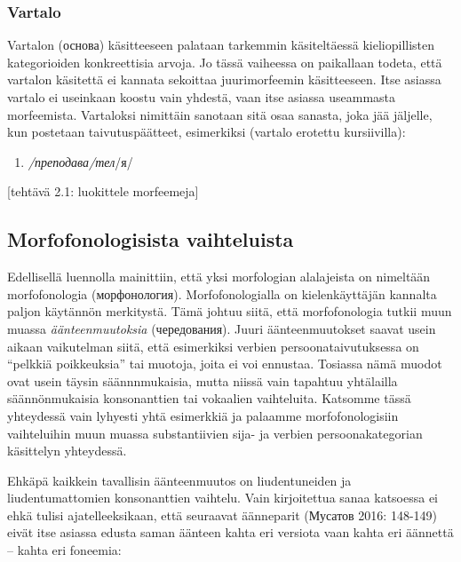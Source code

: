 \documentclass[]{scrartcl}
\begin{document}
\subsubsection{Vartalo}\label{vartalo}

Vartalon (основа) käsitteeseen palataan tarkemmin käsiteltäessä
kieliopillisten kategorioiden konkreettisia arvoja. Jo tässä vaiheessa
on paikallaan todeta, että vartalon käsitettä ei kannata sekoittaa
juurimorfeemin käsitteeseen. Itse asiassa vartalo ei useinkaan koostu
vain yhdestä, vaan itse asiassa useammasta morfeemista. Vartaloksi
nimittäin sanotaan sitä osaa sanasta, joka jää jäljelle, kun postetaan
taivutuspäätteet, esimerkiksi (vartalo erotettu kursiivilla):

\begin{enumerate}
\def\labelenumi{(\arabic{enumi})}
\setcounter{enumi}{12}
\itemsep1pt\parskip0pt
\item
  \emph{/преподава/тел}/я/
\end{enumerate}

{[}tehtävä 2.1: luokittele morfeemeja{]}

\subsection{Morfofonologisista
vaihteluista}\label{morfofonologisista-vaihteluista}

Edellisellä luennolla mainittiin, että yksi morfologian alalajeista on
nimeltään morfofonologia (морфонология). Morfofonologialla on
kielenkäyttäjän kannalta paljon käytännön merkitystä. Tämä johtuu siitä,
että morfofonologia tutkii muun muassa \emph{äänteenmuutoksia}
(чередования). Juuri äänteenmuutokset saavat usein aikaan vaikutelman
siitä, että esimerkiksi verbien persoonataivutuksessa on ``pelkkiä
poikkeuksia'' tai muotoja, joita ei voi ennustaa. Tosiassa nämä muodot
ovat usein täysin säännnmukaisia, mutta niissä vain tapahtuu yhtälailla
säännönmukaisia konsonanttien tai vokaalien vaihteluita. Katsomme tässä
yhteydessä vain lyhyesti yhtä esimerkkiä ja palaamme morfofonologisiin
vaihteluihin muun muassa substantiivien sija- ja verbien
persoonakategorian käsittelyn yhteydessä.

Ehkäpä kaikkein tavallisin äänteenmuutos on liudentuneiden ja
liudentumattomien konsonanttien vaihtelu. Vain kirjoitettua sanaa
katsoessa ei ehkä tulisi ajatelleeksikaan, että seuraavat äänneparit
(Мусатов 2016: 148-149) eivät itse asiassa edusta saman äänteen kahta
eri versiota vaan kahta eri äännettä -- kahta eri foneemia:
\end{document}
